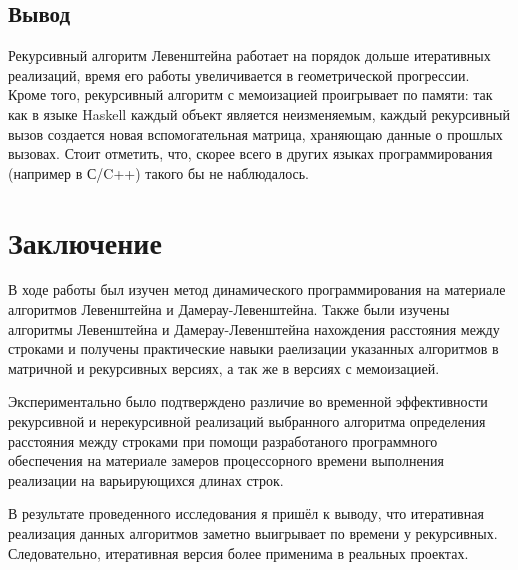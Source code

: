 \documentclass[12pt]{report}
\begin{document}
\section{Вывод}

Рекурсивный алгоритм Левенштейна работает на порядок дольше итеративных реализаций, время его работы увеличивается в геометрической прогрессии. Кроме того, рекурсивный алгоритм с мемоизацией проигрывает по памяти: так как в языке Haskell каждый объект является неизменяемым, каждый рекурсивный вызов создается новая вспомогательная матрица, храняющаю данные о прошлых вызовах. Стоит отметить, что, скорее всего в других языках программирования (например в С/C++) такого бы не наблюдалось.

\chapter*{Заключение}
В ходе работы был изучен метод динамического программирования на материале алгоритмов Левенштейна и Дамерау-Левенштейна. Также были изучены алгоритмы Левенштейна и Дамерау-Левенштейна нахождения расстояния между строками и получены практические навыки раелизации указанных алгоритмов в матричной и рекурсивных версиях, а так же в версиях с мемоизацией. 

Экспериментально было подтверждено различие во временной эффективности рекурсивной и нерекурсивной реализаций выбранного алгоритма определения расстояния между строками при помощи разработаного программного обеспечения на материале замеров процессорного времени выполнения реализации на варьирующихся длинах строк. 

В результате проведенного исследования я пришёл к выводу, что итеративная реализация данных алгоритмов заметно выигрывает по времени у рекурсивных. Следовательно, итеративная версия более применима в реальных проектах.



\end{document}

